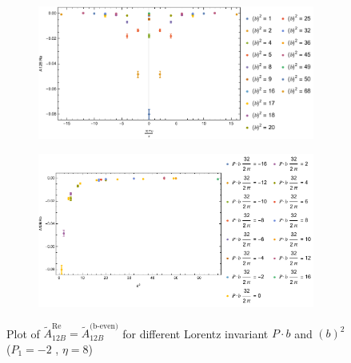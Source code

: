 \documentclass[]{article}
\numberwithin{equation}{section}
\newcommand{\tAmp}{\widetilde{A}}
\newcommand{\tAmp}{\ensuremath{\widetilde{A}^{(+)}}}
\begin{document}
\begin{figure}[h!]
     \centering
     \begin{subfigure}[b]{0.45\textwidth}
         \centering
         \includegraphics[width=\textwidth]{Amp_plots/bP_A12B_b_even_P1_-2_eta_8.pdf}
     \end{subfigure}
     \begin{subfigure}[b]{0.45\textwidth}
         \centering
         \includegraphics[width=\textwidth]{Amp_plots/bsq_A12B_b_even_P1_-2_eta_8.pdf}
     \end{subfigure}
        \caption{Plot of $\tAmp^{\text{Re}}_{12B}=\tAmp^{\text{(b-even)}}_{12B}$ for different Lorentz invariant $P\cdot b$ and $(b)^2$  ($P_{1} = -2$ , $\eta=8$)}
\end{figure}
\end{document}
